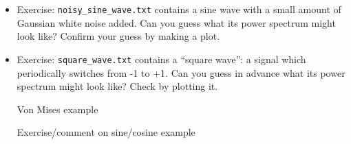 \documentclass[aps,prd,superscriptaddress,groupedaddress,nofootinbib,nobibnotes]{revtex4}
\begin{document}
\begin{itemize}
\item Exercise: {\tt noisy\_sine\_wave.txt} contains a sine wave with a small amount of Gaussian 
  white noise added.  Can you guess what its power spectrum might look like?
  Confirm your guess by making a plot.

\item Exercise: {\tt square\_wave.txt} contains a ``square wave'': a signal which periodically switches
  from -1 to +1.  Can you guess in advance what its power spectrum might look like?  Check by plotting it.

\item [ Von Mises example ]

\item [ Exercise/comment on sine/cosine example ]

\end{itemize}



%

% 
% 

\end{document}
